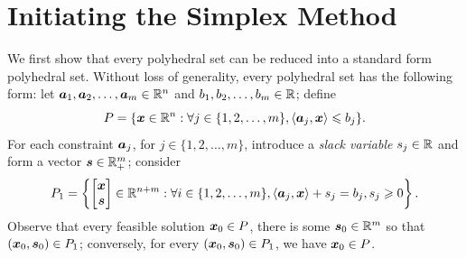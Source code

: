 
\section{Initiating the Simplex Method}



We first show that every polyhedral set can be reduced into a standard form polyhedral set. 
Without loss of generality, every polyhedral set has the following form: let ${\boldsymbol a}_1, {\boldsymbol a}_2, \dots, {\boldsymbol a}_m\in \mathbb R^n$ and $b_1, b_2, \dots, b_m\in\mathbb R$; define
\begin{equation}\label{poly simplex} P = \{{\boldsymbol x}\in\mathbb R^n: \forall j\in\{1, 2, \dots, m\}, \left\langle{\boldsymbol a}_j, {\boldsymbol x}\right\rangle \leqslant b_j\}. \end{equation}
For each constraint ${\boldsymbol a}_j$, for $j\in \{1, 2, \dots, m\}$, introduce a {\em slack variable} $s_j \in \mathbb R$ and form a vector ${\boldsymbol s}\in\mathbb R^m_+$; consider  
\[   P_1 = \left\{\begin{bmatrix} {\boldsymbol x}\\ {\boldsymbol s} \end{bmatrix} \in \mathbb R^{n+m} : \forall i\in\{1, 2, \dots, m\}, \left\langle{\boldsymbol a}_j, {\boldsymbol x}\right\rangle + s_j = b_j, s_j \geqslant 0\right\}. \]
Observe that every feasible solution ${\boldsymbol x}_0 \in P$, there is some ${\boldsymbol s}_0\in\mathbb R^m$ so that $({\boldsymbol x}_0, {\boldsymbol s}_0) \in P_1$; conversely, for every $({\boldsymbol x}_0, {\boldsymbol s}_0) \in P_1$, we have ${\boldsymbol x}_0 \in P$.  

